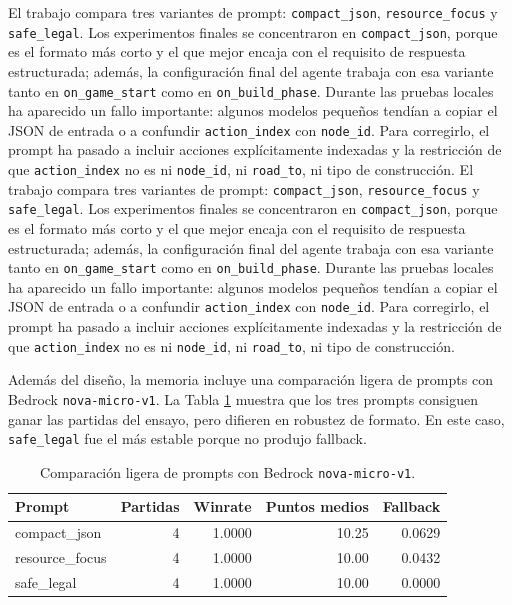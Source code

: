 ﻿\documentclass[10pt,a4paper]{article}
\begin{document}
El trabajo compara tres variantes de prompt: \texttt{compact\_json}, \texttt{resource\_focus} y \texttt{safe\_legal}. Los experimentos finales se concentraron en \texttt{compact\_json}, porque es el formato más corto y el que mejor encaja con el requisito de respuesta estructurada; además, la configuración final del agente trabaja con esa variante tanto en \texttt{on\_game\_start} como en \texttt{on\_build\_phase}. Durante las pruebas locales ha aparecido un fallo importante: algunos modelos pequeños tendían a copiar el JSON de entrada o a confundir \texttt{action\_index} con \texttt{node\_id}. Para corregirlo, el prompt ha pasado a incluir acciones explícitamente indexadas y la restricción de que \texttt{action\_index} no es ni \texttt{node\_id}, ni \texttt{road\_to}, ni tipo de construcción.
El trabajo compara tres variantes de prompt: \texttt{compact\_json}, \texttt{resource\_focus} y \texttt{safe\_legal}. Los experimentos finales se concentraron en \texttt{compact\_json}, porque es el formato más corto y el que mejor encaja con el requisito de respuesta estructurada; además, la configuración final del agente trabaja con esa variante tanto en \texttt{on\_game\_start} como en \texttt{on\_build\_phase}. Durante las pruebas locales ha aparecido un fallo importante: algunos modelos pequeños tendían a copiar el JSON de entrada o a confundir \texttt{action\_index} con \texttt{node\_id}. Para corregirlo, el prompt ha pasado a incluir acciones explícitamente indexadas y la restricción de que \texttt{action\_index} no es ni \texttt{node\_id}, ni \texttt{road\_to}, ni tipo de construcción.

Además del diseño, la memoria incluye una comparación ligera de prompts con Bedrock \texttt{nova-micro-v1}. La Tabla \ref{tab:prompts} muestra que los tres prompts consiguen ganar las partidas del ensayo, pero difieren en robustez de formato. En este caso, \texttt{safe\_legal} fue el más estable porque no produjo fallback.

\begin{table}[H]
\centering
\small
\begin{tabular}{lrrrr}
\toprule
Prompt & Partidas & Winrate & Puntos medios & Fallback \\
\midrule
compact\_json & 4 & 1.0000 & 10.25 & 0.0629 \\
resource\_focus & 4 & 1.0000 & 10.00 & 0.0432 \\
safe\_legal & 4 & 1.0000 & 10.00 & 0.0000 \\
\bottomrule
\end{tabular}
\caption{Comparación ligera de prompts con Bedrock \texttt{nova-micro-v1}.}
\label{tab:prompts}
\end{table}
\end{document}

